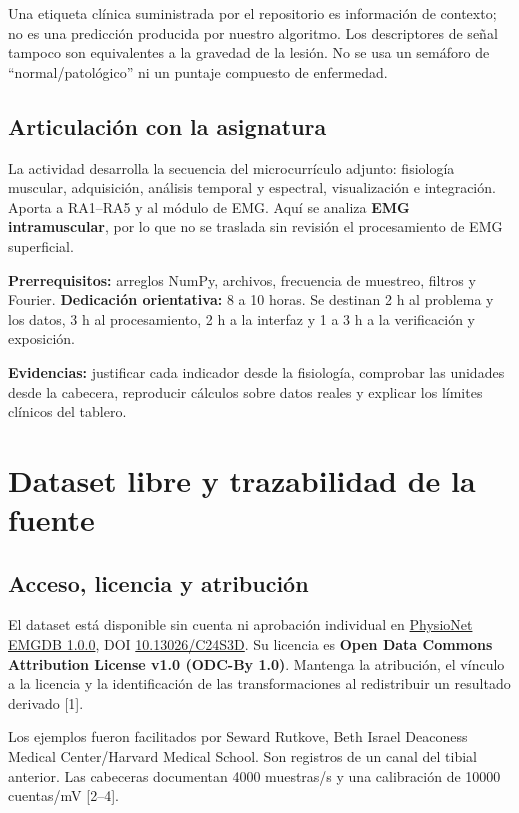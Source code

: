 \documentclass[
  spanish,
  10.5pt,
  a4paper,
  DIV=11,
  numbers=noendperiod]{scrartcl}
\begin{document}
Una etiqueta clínica suministrada por el repositorio es información de
contexto; no es una predicción producida por nuestro algoritmo. Los
descriptores de señal tampoco son equivalentes a la gravedad de la
lesión. No se usa un semáforo de ``normal/patológico'' ni un puntaje
compuesto de enfermedad.

\subsection{Articulación con la
asignatura}\label{articulaciuxf3n-con-la-asignatura}

La actividad desarrolla la secuencia del microcurrículo adjunto:
fisiología muscular, adquisición, análisis temporal y espectral,
visualización e integración. Aporta a RA1--RA5 y al módulo de EMG. Aquí
se analiza \textbf{EMG intramuscular}, por lo que no se traslada sin
revisión el procesamiento de EMG superficial.

\textbf{Prerrequisitos:} arreglos NumPy, archivos, frecuencia de
muestreo, filtros y Fourier. \textbf{Dedicación orientativa:} 8 a 10
horas. Se destinan 2 h al problema y los datos, 3 h al procesamiento, 2
h a la interfaz y 1 a 3 h a la verificación y exposición.

\textbf{Evidencias:} justificar cada indicador desde la fisiología,
comprobar las unidades desde la cabecera, reproducir cálculos sobre
datos reales y explicar los límites clínicos del tablero.

\section{Dataset libre y trazabilidad de la
fuente}\label{dataset-libre-y-trazabilidad-de-la-fuente}

\subsection{Acceso, licencia y
atribución}\label{acceso-licencia-y-atribuciuxf3n}

El dataset está disponible sin cuenta ni aprobación individual en
\href{https://physionet.org/content/emgdb/1.0.0/}{PhysioNet EMGDB
1.0.0}, DOI \href{https://doi.org/10.13026/C24S3D}{10.13026/C24S3D}. Su
licencia es \textbf{Open Data Commons Attribution License v1.0 (ODC-By
1.0)}. Mantenga la atribución, el vínculo a la licencia y la
identificación de las transformaciones al redistribuir un resultado
derivado {[}1{]}.

Los ejemplos fueron facilitados por Seward Rutkove, Beth Israel
Deaconess Medical Center/Harvard Medical School. Son registros de un
canal del tibial anterior. Las cabeceras documentan 4000 muestras/s y
una calibración de 10000 cuentas/mV {[}2--4{]}.
\end{document}
